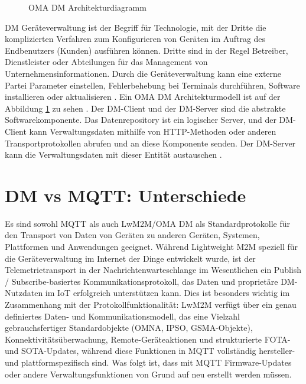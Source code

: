\begin{figure}[h!]
	\centering
	\caption{OMA DM Architekturdiagramm}
	\label{fig:oma_arch}
\end{figure}

DM Geräteverwaltung ist der Begriff für Technologie, mit der Dritte die komplizierten Verfahren zum Konfigurieren von Geräten im Auftrag des Endbenutzers (Kunden) ausführen können. Dritte sind in der Regel Betreiber, Dienstleister oder Abteilungen für das Management von Unternehmensinformationen. Durch die Geräteverwaltung kann eine externe Partei Parameter einstellen, Fehlerbehebung bei Terminals durchführen, Software installieren oder aktualisieren \cite[p.7]{website:OMADM2}. Ein OMA DM Architekturmodell ist auf der Abbildung \ref{fig:oma_arch} zu sehen \cite[p.9]{website:OMADM2}.  Der DM-Client und der DM-Server sind die abstrakte Softwarekomponente. Das Datenrepository ist ein logischer Server, und der DM-Client kann Verwaltungsdaten mithilfe von HTTP-Methoden oder anderen Transportprotokollen abrufen und an diese Komponente senden. Der DM-Server kann die Verwaltungsdaten mit dieser Entität austauschen \cite[p.10]{website:OMADM2}.

\section{DM vs MQTT: Unterschiede}
\label{sec:ota:diff}
Es sind sowohl MQTT als auch LwM2M/OMA DM als Standardprotokolle für den Transport von Daten von Geräten zu anderen Geräten, Systemen, Plattformen und Anwendungen geeignet. Während Lightweight M2M speziell für die Geräteverwaltung im Internet der Dinge entwickelt wurde, ist der Telemetrietransport in der Nachrichtenwarteschlange im Wesentlichen ein Publish / Subscribe-basiertes Kommunikationsprotokoll, das Daten und proprietäre DM-Nutzdaten im IoT erfolgreich unterstützen kann. Dies ist besonders wichtig im Zusammenhang mit der Protokollfunktionalität: LwM2M verfügt über ein genau definiertes Daten- und Kommunikationsmodell, das eine Vielzahl gebrauchsfertiger Standardobjekte (OMNA, IPSO, GSMA-Objekte), Konnektivitätsüberwachung, Remote-Geräteaktionen und strukturierte FOTA- und SOTA-Updates, während diese Funktionen in MQTT vollständig hersteller- und plattformspezifisch sind. Was folgt ist, dass mit MQTT Firmware-Updates oder andere Verwaltungsfunktionen von Grund auf neu erstellt werden müssen.

